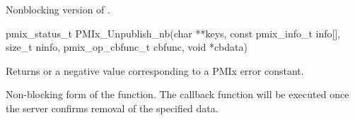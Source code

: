 \summary

Nonblocking version of .

\format

\cspecificstart
\begin{codepar}
pmix_status_t
PMIx_Unpublish_nb(char **keys,
                  const pmix_info_t info[], size_t ninfo,
                  pmix_op_cbfunc_t cbfunc, void *cbdata)
\end{codepar}
\cspecificend

\begin{arglist}
\end{arglist}

Returns  or a negative value corresponding to a PMIx error constant.

\descr

Non-blocking form of the  function.
The callback function will be executed once the server confirms removal of the specified data.



